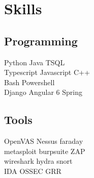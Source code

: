 \documentclass[letterpaper]{deedy-resume} %
\begin{document}
\begin{minipage}[t]{0.28\textwidth}




\section{Skills}

\subsection{Programming}

Python \textbullet{} Java \textbullet{} TSQL \\
Typescript \textbullet{} Javascript \textbullet{} C++ \\
Bash \textbullet{} Powershell \\
Django \textbullet{} Angular 6 \textbullet{} Spring

\sectionspace %

\subsection{Tools}
OpenVAS \textbullet{} Nessus \textbullet{} faraday \\
metasploit \textbullet{} burpsuite \textbullet{} ZAP \\
wireshark \textbullet{} hydra \textbullet{} snort \\
IDA \textbullet{} OSSEC \textbullet{} GRR

\sectionspace %


\end{minipage}
\end{document}
